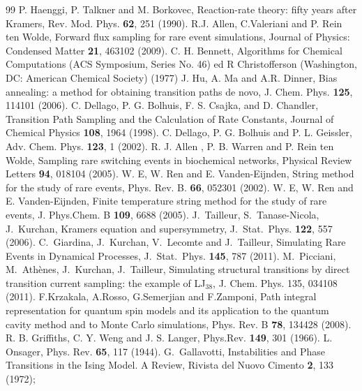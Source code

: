\documentclass[aps,twocolumn,floats,pre,amsmath,superscriptaddress]{revtex4}
\newcommand{\<}{\langle}
\renewcommand{\>}{\rangle}
\begin{document}
\begin{thebibliography}{99}
%
%
P. Haenggi, P. Talkner and M. Borkovec, Reaction-rate theory: fifty years after Kramers, Rev. Mod. Phys. {\bf 62}, 251 (1990).
%
 R.J. Allen, C.Valeriani and P. Rein ten Wolde, Forward flux sampling for rare event simulations, Journal of Physics: Condensed Matter {\bf 21}, 463102 (2009).
C. H. Bennett, Algorithms for Chemical Computations (ACS Symposium, Series No. 46) ed R Christofferson (Washington, DC: American Chemical Society) (1977)
J. Hu, A.  Ma and A.R. Dinner, Bias annealing: a method for obtaining transition paths de novo, J. Chem. Phys. {\bf 125}, 114101 (2006).
%
C. Dellago, P. G. Bolhuis, F. S. Csajka, and D. Chandler, Transition Path Sampling and the Calculation of Rate Constants, Journal of Chemical Physics {\bf 108}, 1964 (1998).
%
 C. Dellago, P. G. Bolhuis and P. L. Geissler, Adv. Chem. Phys. {\bf 123}, 1 (2002).
R. J. Allen , P. B. Warren and P. Rein ten Wolde, Sampling rare switching events in biochemical networks, Physical Review Letters {\bf 94}, 018104 (2005).
W. E,  W. Ren and E. Vanden-Eijnden, String method for the study of rare events, Phys. Rev. B. {\bf 66}, 052301 (2002).
W. E,  W. Ren and E. Vanden-Eijnden, Finite temperature string method for the study of rare events, J. Phys.Chem. B {\bf 109}, 6688 (2005).
%
J.~Tailleur, S.~Tanase-Nicola, J.~Kurchan, Kramers equation and supersymmetry,
J.~Stat.~Phys. {\bf 122}, 557 (2006).
%
C.~Giardina, J.~Kurchan, V.~Lecomte and J.~Tailleur, 
Simulating Rare Events in Dynamical Processes,
J.~Stat.~Phys. {\bf 145}, 787 (2011).
%
M.~Picciani, M.~Ath\`enes, J.~Kurchan, J.~Tailleur, 
Simulating structural transitions by direct transition current sampling: the example of LJ$_{38}$, J. Chem. Phys. 135, 034108 (2011).
%
F.Krzakala, A.Rosso, G.Semerjian and F.Zamponi, 
Path integral representation for quantum spin models and its application to the quantum cavity method and to Monte Carlo simulations, 
Phys. Rev. B {\bf 78}, 134428 (2008). 
R. B. Griffiths, C. Y. Weng and J. S. Langer,  Phys.Rev. {\bf 149}, 301 (1966).
L. Onsager, Phys. Rev. {\bf 65}, 117 (1944).
  G.~Gallavotti, Instabilities and Phase Transitions in the Ising Model. A Review, Rivista del Nuovo Cimento {\bf 2}, 133 (1972);

\end{thebibliography}
\end{document}
